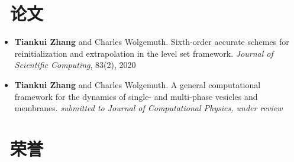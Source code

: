 \documentclass{resume}
\begin{document}
\section{\faBook\ 论文}
\begin{itemize}[parsep=0.5ex]
  \item \textbf{Tiankui Zhang} and Charles Wolgemuth. Sixth-order accurate schemes for reinitialization and extrapolation in the level set framework. \textit{Journal of Scientific Computing}, 83(2), 2020
  \item \textbf{Tiankui Zhang} and Charles Wolgemuth. A general computational framework for the dynamics of single- and multi-phase vesicles and membranes. \textit{submitted to Journal of Computational Physics, under review}
\end{itemize}

\section{\faThumbsUp\ 荣誉}


%
%
\end{document}
